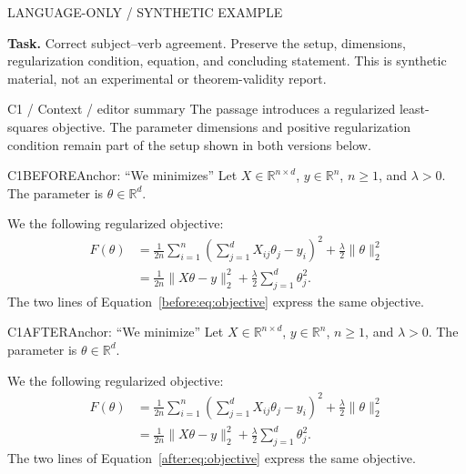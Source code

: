 \documentclass[11pt]{article}
\begin{document}
{\small\color{rcMuted}LANGUAGE-ONLY / SYNTHETIC EXAMPLE}

\textbf{Task.} Correct subject--verb agreement. Preserve the setup, dimensions,
regularization condition, equation, and concluding statement.
This is synthetic material, not an experimental or theorem-validity report.

\begin{rcContext}{C1 / Context / editor summary}
The passage introduces a regularized least-squares objective. The parameter
dimensions and positive regularization condition remain part of the setup
shown in both versions below.
\end{rcContext}

\begin{rcPassage}{C1}{BEFORE}{Anchor: ``We minimizes''}
\renewcommand{\theequation}{B\arabic{equation}}
\renewcommand{\theHequation}{before.\arabic{equation}}
\setcounter{equation}{0}
Let $X\in\mathbb{R}^{n\times d}$, $y\in\mathbb{R}^{n}$,
$n\geq 1$, and $\lambda>0$. The parameter is $\theta\in\mathbb{R}^d$.

We  the following regularized objective:
\begin{align}
F(\theta)
 &= \frac{1}{2n}\sum_{i=1}^{n}
    \left(\sum_{j=1}^{d}X_{ij}\theta_j-y_i\right)^2
    +\frac{\lambda}{2}\|\theta\|_2^2 \label{before:eq:objective}\\
 &= \frac{1}{2n}\|X\theta-y\|_2^2
    +\frac{\lambda}{2}\sum_{j=1}^{d}\theta_j^2. \nonumber
\end{align}
The two lines of Equation~\eqref{before:eq:objective} express the same objective.
\end{rcPassage}

\begin{rcPassage}{C1}{AFTER}{Anchor: ``We minimize''}
\renewcommand{\theequation}{A\arabic{equation}}
\renewcommand{\theHequation}{after.\arabic{equation}}
\setcounter{equation}{0}
Let $X\in\mathbb{R}^{n\times d}$, $y\in\mathbb{R}^{n}$,
$n\geq 1$, and $\lambda>0$. The parameter is $\theta\in\mathbb{R}^d$.

We  the following regularized objective:
\begin{align}
F(\theta)
 &= \frac{1}{2n}\sum_{i=1}^{n}
    \left(\sum_{j=1}^{d}X_{ij}\theta_j-y_i\right)^2
    +\frac{\lambda}{2}\|\theta\|_2^2 \label{after:eq:objective}\\
 &= \frac{1}{2n}\|X\theta-y\|_2^2
    +\frac{\lambda}{2}\sum_{j=1}^{d}\theta_j^2. \nonumber
\end{align}
The two lines of Equation~\eqref{after:eq:objective} express the same objective.
\end{rcPassage}
\end{document}
